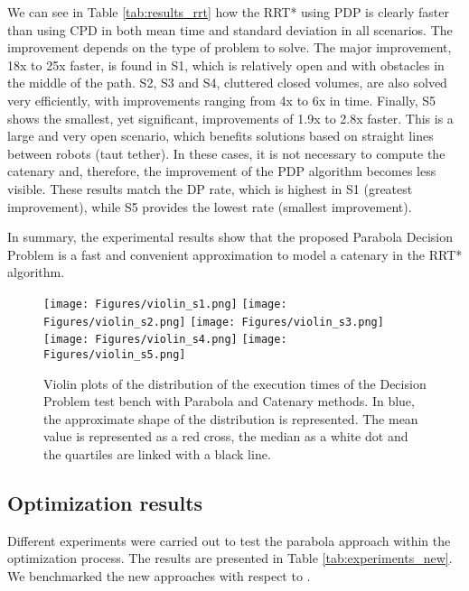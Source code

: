 We can see in Table \ref{tab:results_rrt} how the RRT* using PDP is clearly faster than using CPD in both mean time and standard deviation in all scenarios. The improvement depends on the type of problem to solve. The major improvement, 18x to 25x faster, is found in S1, which is relatively open and with obstacles in the middle of the path. S2, S3 and S4, cluttered closed volumes, are also solved very efficiently, with improvements ranging from 4x to 6x in time. Finally, S5 shows the smallest, yet significant, improvements of 1.9x to 2.8x faster. This is a large and very open scenario, which benefits solutions based on straight lines between robots (taut tether). In these cases, it is not necessary to compute the catenary and, therefore, the improvement of the PDP algorithm becomes less visible. These results match the DP rate, which is highest in S1 (greatest improvement), while S5 provides the lowest rate (smallest improvement).

In summary, the experimental results show that the proposed Parabola Decision Problem is a fast and convenient approximation to model a catenary in the RRT* algorithm.


\begin{figure*}[t!]
  \centering
  \texttt{[image: Figures/violin\_s1.png]}
  \hfill
  \texttt{[image: Figures/violin\_s2.png]}
  \hfill
  \texttt{[image: Figures/violin\_s3.png]}
  \hfill
  \texttt{[image: Figures/violin\_s4.png]}
  \hfill
  \texttt{[image: Figures/violin\_s5.png]}
  \caption{Violin plots of the distribution of the execution times of the Decision Problem test bench with Parabola and Catenary methods. In blue, the approximate shape of the distribution is represented. The mean value is represented as a red cross, the median as a white dot and the quartiles are linked with a black line. }
  \label{fig:rrt_results}
\end{figure*}



\subsection{Optimization results}

Different experiments were carried out to test the parabola approach within the optimization process. The results are presented in Table \ref{tab:experiments_new}. We benchmarked the new approaches with respect to \cite{smartinezr2023}.

